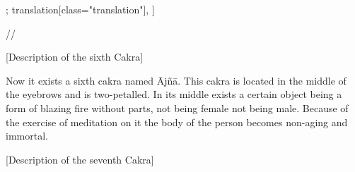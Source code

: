 \documentclass[12pt]{article}%
\begin{document}
\begin{alignment}[
    texts=edition[class="edition"];
    translation[class="translation"],
  ]
\begin{edition}
\begin{prose}
   //   
 \end{prose}
\end{edition}
\begin{translation}
   \bigskip
    \centerline{\textrm{\small{[Description of the sixth Cakra]}}}
    \bigskip
  \begin{tlate}Now it exists a sixth cakra named Ājñā.  This cakra is located in the middle of the eyebrows and is two-petalled. In its middle exists a certain object being a form of blazing fire without parts, not being female not being male. Because of the exercise of meditation on it the body of the person becomes non-aging and immortal.\end{tlate}
\end{translation}
\clearpage
\begin{edition}
   \bigskip
    \centerline{\textrm{\small{[Description of the seventh Cakra]}}}
    \bigskip
    \begin{prose}

\end{prose}
\end{edition}
\end{alignment}
\end{document}
